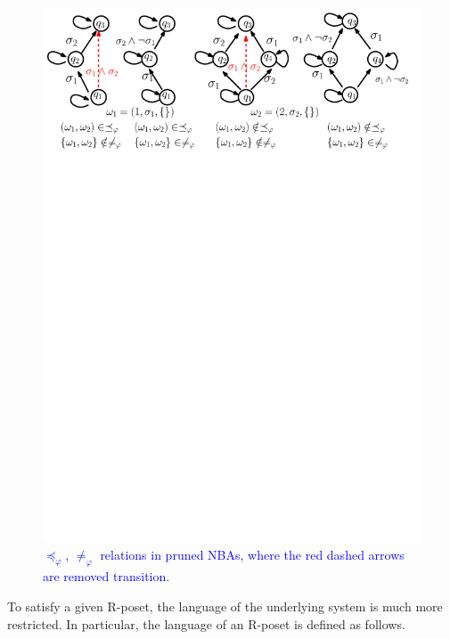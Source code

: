 \begin{figure}
	\centering
	\includegraphics[scale=0.4]{figures/explain_about_remark4.pdf}
	\caption{\textcolor{blue}{$\preceq_\varphi$, $\neq_\varphi$ relations in pruned NBAs,
			where the red dashed arrows are removed transition.}}
	\label{fig:example_remark_4}
\end{figure}

To satisfy a given R-poset, the language of the underlying system is
much more restricted.
In particular, the language of an R-poset is defined as follows.

